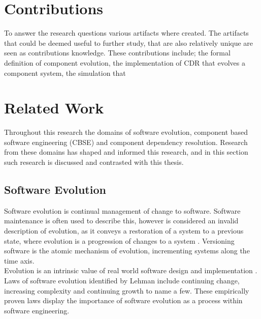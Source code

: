 \section{Contributions}
To answer the research questions various artifacts where created.
The artifacts that could be deemed useful to further study, that are also relatively unique are seen as contributions knowledge. 
These contributions include; the formal definition of component evolution, the implementation of CDR that evolves a component system,
the simulation that  






\section{Related Work}
Throughout this research the domains of software evolution, component based software engineering (CBSE) and component dependency resolution.
Research from these domains has shaped and informed this research, and in this section such research is discussed and contrasted with this thesis.

\subsection{Software Evolution}
Software evolution is continual management of change to software. 
Software maintenance is often used to describe this,
however is considered an invalid description of evolution, as it conveys a
restoration of a system to a previous state, where evolution is a progression
of changes to a system \citep{lehman_software_2006}. Versioning software is the atomic mechanism of evolution, 
incrementing systems along the time axis.\\ 
Evolution is an intrinsic value of real world software
design and implementation \citep{lehman_programs_1980}. Laws of software
evolution identified by Lehman include continuing change, increasing complexity and
continuing growth \citep{lehman_rules_2001} to name a few. These empirically proven laws
display the importance of software evolution as a process within software
engineering.

